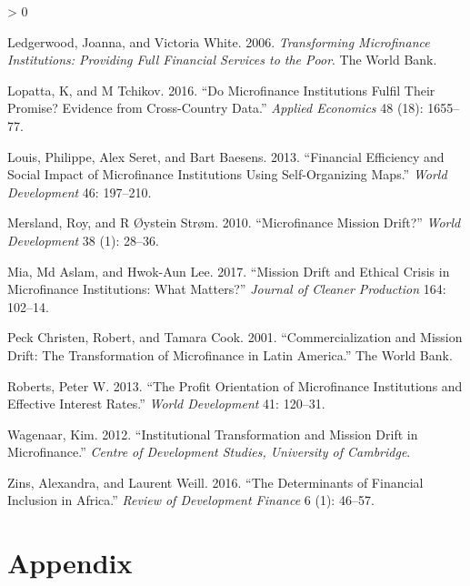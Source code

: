\documentclass[
]{article}
\newlength{\cslhangindent}
\newenvironment{CSLReferences}[2] %
 {%
  \setlength{\parindent}{0pt}
  \ifodd #1 \everypar{\setlength{\hangindent}{\cslhangindent}}\ignorespaces\fi
  \ifnum #2 > 0
  \setlength{\parskip}{#2\baselineskip}
  \fi
 }%
 {}
\begin{document}
\begin{CSLReferences}{1}{0}
\leavevmode\hypertarget{ref-ledgerwood2006transforming}{}%
Ledgerwood, Joanna, and Victoria White. 2006. \emph{Transforming
Microfinance Institutions: Providing Full Financial Services to the
Poor}. The World Bank.

\leavevmode\hypertarget{ref-lopatta2016microfinance}{}%
Lopatta, K, and M Tchikov. 2016. {``Do Microfinance Institutions Fulfil
Their Promise? Evidence from Cross-Country Data.''} \emph{Applied
Economics} 48 (18): 1655--77.

\leavevmode\hypertarget{ref-louis2013financial}{}%
Louis, Philippe, Alex Seret, and Bart Baesens. 2013. {``Financial
Efficiency and Social Impact of Microfinance Institutions Using
Self-Organizing Maps.''} \emph{World Development} 46: 197--210.

\leavevmode\hypertarget{ref-mersland2010microfinance}{}%
Mersland, Roy, and R Øystein Strøm. 2010. {``Microfinance Mission
Drift?''} \emph{World Development} 38 (1): 28--36.

\leavevmode\hypertarget{ref-mia2017mission}{}%
Mia, Md Aslam, and Hwok-Aun Lee. 2017. {``Mission Drift and Ethical
Crisis in Microfinance Institutions: What Matters?''} \emph{Journal of
Cleaner Production} 164: 102--14.

\leavevmode\hypertarget{ref-peck2001commercialization}{}%
Peck Christen, Robert, and Tamara Cook. 2001. {``Commercialization and
Mission Drift: The Transformation of Microfinance in Latin America.''}
The World Bank.

\leavevmode\hypertarget{ref-roberts2013profit}{}%
Roberts, Peter W. 2013. {``The Profit Orientation of Microfinance
Institutions and Effective Interest Rates.''} \emph{World Development}
41: 120--31.

\leavevmode\hypertarget{ref-wagenaar2012institutional}{}%
Wagenaar, Kim. 2012. {``Institutional Transformation and Mission Drift
in Microfinance.''} \emph{Centre of Development Studies, University of
Cambridge}.

\leavevmode\hypertarget{ref-zins2016determinants}{}%
Zins, Alexandra, and Laurent Weill. 2016. {``The Determinants of
Financial Inclusion in Africa.''} \emph{Review of Development Finance} 6
(1): 46--57.

\end{CSLReferences}

\hypertarget{appendix}{%
\section{\texorpdfstring{\textbf{Appendix}}{Appendix}}\label{appendix}}
\end{document}
